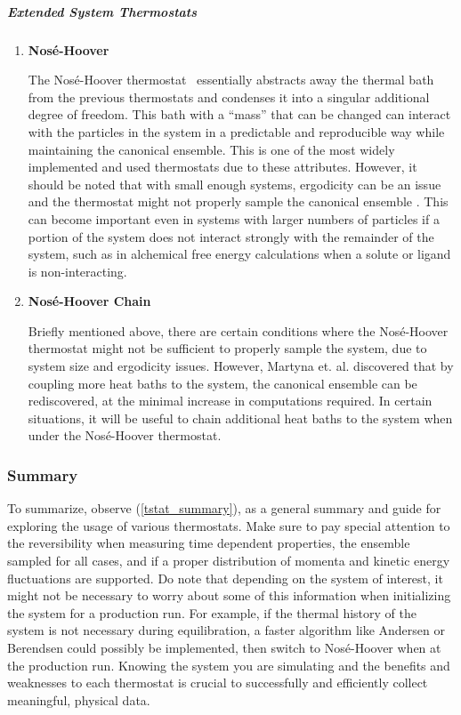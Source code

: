 \documentclass[9pt,bestpractices]{livecoms}
\begin{document}
\subparagraph{Extended System Thermostats}
\begin{enumerate}[listparindent=\parindent]

\item {\bf Nos\'{e}-Hoover}

   The Nos\'{e}-Hoover thermostat~\cite{thermostatAlgorithms2005} essentially abstracts away the thermal bath from the previous thermostats and condenses it into a singular additional degree of freedom.
    This bath with a ``mass'' that can be changed can interact with the particles in the system in a predictable and reproducible way while maintaining the
    canonical ensemble.
    This is one of the most widely implemented and used thermostats due to these attributes.
    However, it should be noted that with small enough systems, ergodicity can be an issue and the thermostat might not properly sample the canonical ensemble \cite{martyna1992nose,thermostatAlgorithms2005}. 
    This can become important even in systems with larger numbers of particles if a portion of the system does not interact strongly with the remainder of the system, such as in alchemical free energy calculations when a solute or ligand is non-interacting.
    
    
\item {\bf Nos\'{e}-Hoover Chain}

    Briefly mentioned above, there are certain conditions where the Nos\'{e}-Hoover thermostat might not be sufficient to properly sample the system, due to
   system size and ergodicity issues\cite{martyna1992nose, thermostatAlgorithms2005}. 
    However, Martyna et. al.  \cite{martyna1992nose} discovered that by coupling more heat baths to the system, the canonical ensemble can be rediscovered, at the minimal increase in computations required. In certain situations, it will be useful to chain additional heat baths to the system when under the Nos\'{e}-Hoover thermostat.

\end{enumerate}


\subsubsection{Summary}
To summarize, observe (\ref{tstat_summary}), as a general summary and guide for exploring the usage of various thermostats. Make sure to pay special attention to the reversibility when measuring time dependent properties, the ensemble sampled for all cases, and if a proper distribution of momenta and kinetic energy fluctuations are supported.
Do note that depending on the system of interest, it might not be necessary to worry about some of this information when initializing the system for a production run.
For example, if the thermal history of the system is not necessary during equilibration, a faster algorithm like Andersen or Berendsen could possibly be implemented, then switch to Nos\'{e}-Hoover when at the production run.
Knowing the system you are simulating and the benefits and weaknesses to each thermostat is crucial to successfully and efficiently collect meaningful, physical data.
\end{document}
